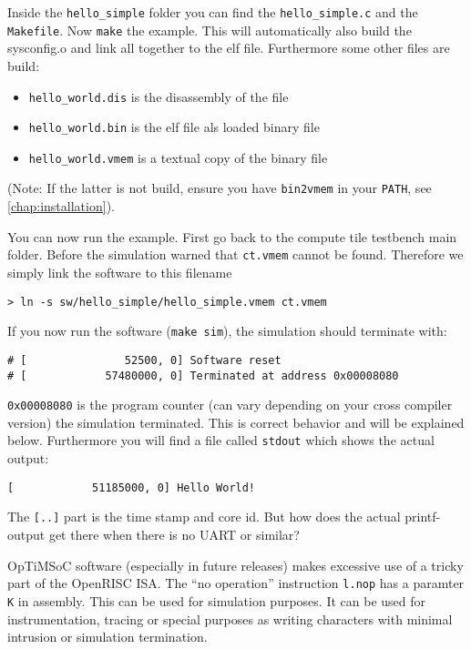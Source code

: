 Inside the \verb|hello_simple| folder you can find the
\verb|hello_simple.c| and the \verb|Makefile|. Now \verb|make| the
example. This will automatically also build the sysconfig.o and link
all together to the elf file. Furthermore some other files are build:

\begin{itemize}
\item \verb|hello_world.dis| is the disassembly of the file
\item \verb|hello_world.bin| is the elf file als loaded binary file
\item \verb|hello_world.vmem| is a textual copy of the binary file
\end{itemize}

(Note: If the latter is not build, ensure you have \verb|bin2vmem| in
your \verb|PATH|, see
\ref{chap:installation}).

You can now run the example. First go back to the compute tile
testbench main folder. Before the simulation warned that
\verb|ct.vmem| cannot be found. Therefore we simply link the software
to this filename

\begin{verbatim}
> ln -s sw/hello_simple/hello_simple.vmem ct.vmem
\end{verbatim}

If you now run the software (\verb|make sim|), the simulation should
terminate with:

\begin{verbatim}
# [               52500, 0] Software reset
# [            57480000, 0] Terminated at address 0x00008080
\end{verbatim}

\verb|0x00008080| is the program counter (can vary depending on your cross
compiler version) the simulation terminated. This is correct behavior
and will be explained below. Furthermore you will find a file called
\verb|stdout| which shows the actual output:

\begin{verbatim}
[            51185000, 0] Hello World!
\end{verbatim}

The \verb|[..]| part is the time stamp and core id. But how does the
actual printf-output get there when there is no UART or similar?

OpTiMSoC software (especially in future releases) makes excessive use
of a tricky part of the OpenRISC ISA. The ``no operation'' instruction
\verb|l.nop| has a paramter \verb|K| in assembly. This can be used for
simulation purposes. It can be used for instrumentation, tracing or
special purposes as writing characters with minimal intrusion or
simulation termination.

